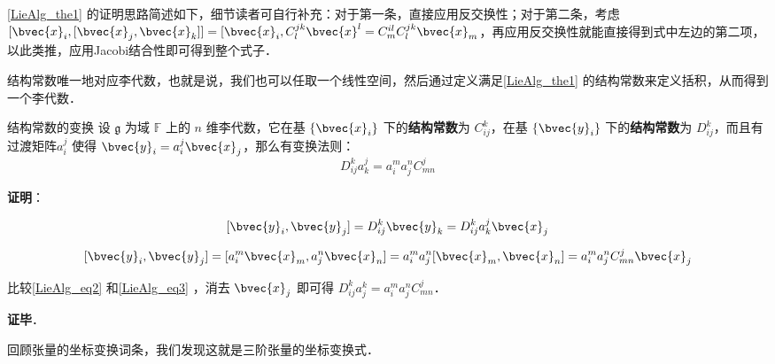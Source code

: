 \autoref{LieAlg_the1} 的证明思路简述如下，细节读者可自行补充：对于第一条，直接应用反交换性；对于第二条，考虑 $[\bvec{x}_i, [\bvec{x}_j, \bvec{x}_k]]=[\bvec{x}_i, C^{jk}_l \bvec{x}^l=C^{il}_mC^{jk}_l \bvec{x}_m$，再应用反交换性就能直接得到式中左边的第二项，以此类推，应用Jacobi结合性即可得到整个式子．

结构常数唯一地对应李代数，也就是说，我们也可以任取一个线性空间，然后通过定义满足\autoref{LieAlg_the1} 的结构常数来定义括积，从而得到一个李代数．

\begin{theorem}{结构常数的变换}
设 $\mathfrak{g}$ 为域 $\mathbb{F}$ 上的 $n$ 维李代数，它在基 $\{\bvec{x}_i\}$ 下的\textbf{结构常数}为 $C^k_{ij}$，在基 $\{\bvec{y}_i\}$ 下的\textbf{结构常数}为 $D^k_{ij}$，而且有过渡矩阵$a_i^j$ 使得 $\bvec{y}_i=a_i^j\bvec{x}_j$，那么有变换法则：
\begin{equation}
D_{ij}^k a_k^j=a_i^m a_j^n C^j_{mn}
\end{equation}

\end{theorem}

\textbf{证明}：

\begin{equation}\label{LieAlg_eq2}
[\bvec{y}_i, \bvec{y}_j] = D_{ij}^k \bvec{y}_k = D_{ij}^k a_k^j \bvec{x}_j
\end{equation}

\begin{equation}\label{LieAlg_eq3}
[\bvec{y}_i, \bvec{y}_j]=[a_i^m \bvec{x}_m, a_j^n \bvec{x}_n]=a_i^m a_j^n[\bvec{x}_m, \bvec{x}_n]=a_i^m a_j^n C^j_{mn} \bvec{x}_j
\end{equation}

比较\autoref{LieAlg_eq2} 和\autoref{LieAlg_eq3} ，消去 $\bvec{x}_j$ 即可得 $D_{ij}^k a^k_j = a_i^m a_j^n C^j_{mn}$．

\textbf{证毕}．

回顾张量的坐标变换词条，我们发现这就是三阶张量的坐标变换式．






